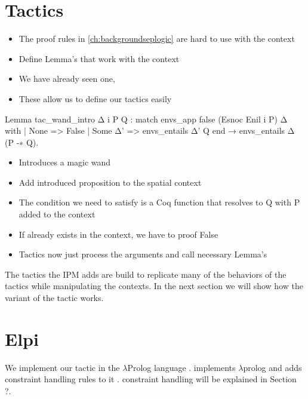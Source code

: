 \documentclass[thesis.tex]{subfiles}
\begin{document}
{\section{Tactics}
\begin{itemize}
  \item The proof rules in \cref{ch:backgroundseplogic} are hard to use with the context
  \item Define Lemma's that work with the context
  \item We have already seen one, 
  \item These allow us to define our tactics easily
\end{itemize}
\begin{coqcode}
  Lemma tac_wand_intro Δ i P Q :
    match envs_app false (Esnoc Enil i P) Δ with
    | None => False
    | Some Δ' => envs_entails Δ' Q
    end →
    envs_entails Δ (P -∗ Q).
\end{coqcode}
\begin{itemize}
  \item Introduces a magic wand
  \item Add introduced proposition to the spatial context
  \item The condition we need to satisfy is a Coq function that resolves to Q with P added to the context
  \item If  already exists in the context, we have to proof False
  \item Tactics now just process the arguments and call necessary Lemma's
\end{itemize}
The tactics the IPM adds are build to replicate many of the behaviors of the \coq tactics while manipulating the \iris contexts. In the next section we will show how the \iris variant of the  tactic works.

\section{Elpi}

We implement our tactic in the $\lambda$Prolog language \elpi \cite{dunchevELPIFastEmbeddable2015,guidiImplementingTypeTheory2019}. \elpi implements $\lambda$prolog \cite{millerHigherorderLogicProgramming1986,millerUniformProofsFoundation1991,belleanneePragmaticReconstructionLProlog1999,millerProgrammingHigherOrderLogic2012} and adds constraint handling rules to it \cite{monfroyConstraintHandlingRules2011}. constraint handling will be explained in Section ?.

}
\end{document}
